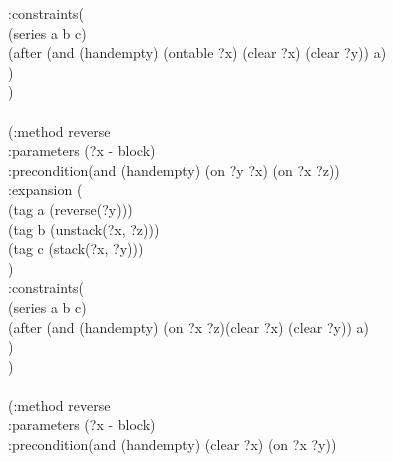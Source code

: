 \begin{appendix}
\hspace*{2cm}  :constraints(\\
\hspace*{2.5cm}        (series a b c)\\
\hspace*{2.5cm}        (after (and (handempty) (ontable ?x) (clear ?x) (clear ?y)) a)\\
\hspace*{2cm}  )\\
\hspace*{1.5cm})
\\
\\ \hspace*{1.5cm}(:method reverse\\
\hspace*{2cm}  :parameters  (?x - block)\\
\hspace*{2cm}  :precondition(and (handempty) (on ?y ?x) (on ?x ?z))\\
\hspace*{2cm}  :expansion  (\\
\hspace*{2.5cm}        (tag a (reverse(?y)))\\
\hspace*{2.5cm}        (tag b (unstack(?x, ?z)))\\
\hspace*{2.5cm}        (tag c (stack(?x, ?y)))\\
\hspace*{2cm}  )\\
\hspace*{2cm}  :constraints(\\
\hspace*{2.5cm}        (series a b c)\\
\hspace*{2.5cm}        (after (and (handempty)  (on ?x ?z)(clear ?x) (clear ?y)) a)\\
\hspace*{2cm}  )\\
\hspace*{1.5cm})
\\
\\ \hspace*{1.5cm}(:method reverse\\
\hspace*{2cm}  :parameters  (?x - block)\\
\hspace*{2cm}  :precondition(and (handempty) (clear ?x) (on ?x ?y))\\

\end{appendix}
